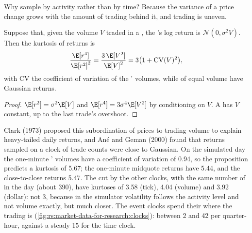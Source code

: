 Why sample by activity rather than by time? Because the variance of a price change grows with the amount of trading behind
it, and trading is uneven.

\begin{proposition}\label{prop:rs:market-data-for-research:mixture}
Suppose that, given the volume $V$ traded in a , the 's log return is $\mathcal N(0, \sigma^2V)$. Then the kurtosis of
 returns is
\[
\frac{\E[r^4]}{\E[r^2]^2} = \frac{3\,\E[V^2]}{\E[V]^2} = 3\bigl(1 + \mathrm{CV}(V)^2\bigr),
\]
with $\mathrm{CV}$ the coefficient of variation of the ' volumes, while  of equal volume have Gaussian returns.
\end{proposition}

\begin{proof}
$\E[r^2] = \sigma^2\E[V]$ and $\E[r^4] = 3\sigma^4\E[V^2]$ by conditioning on $V$. A  has $V$ constant, up to the last
trade's overshoot.
\end{proof}

Clark (1973) proposed this subordination of prices to trading volume to explain heavy-tailed daily returns, and Ané and Geman
(2000) found that returns sampled on a clock of trade counts were close to Gaussian. On the simulated day the one-minute '
volumes have a coefficient of variation of 0.94, so the proposition predicts a kurtosis of 5.67; the one-minute midquote returns
have 5.44, and the close-to-close returns 5.47. The  cut by the other clocks, with the same number of  in the day (about
390), have kurtoses of 3.58 (tick), 4.04 (volume) and 3.92 (dollar): not 3, because in the simulator volatility follows the
activity level and not volume exactly, but much closer. The event clocks spend their  where the trading is
(\cref{fig:rs:market-data-for-research:clocks}): between 2 and 42  per quarter-hour, against a steady 15 for the time clock.

